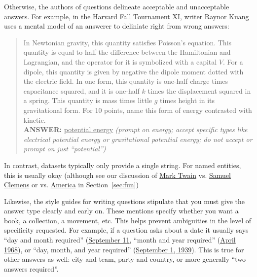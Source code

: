 Otherwise, the authors of questions delineate acceptable and unacceptable answers.  
For example, in the Harvard Fall Tournament XI, writer Raynor Kuang uses a mental model of an answerer to deliniate right from wrong answers:
\begin{quote}
     In Newtonian gravity, this quantity satisfies Poisson's equation. This quantity is equal to half the difference between the Hamiltonian and Lagrangian, and the operator for it is symbolized with a capital $V$. For a dipole, this quantity is given by negative the dipole moment dotted with the electric field. In one form, this quantity is one-half charge times capacitance squared, and it is one-half $k$ times the displacement squared in a spring. This quantity is mass times little $g$ times height in its gravitational form. For 10 points, name this form of energy contrasted with kinetic.\\
    {\bf ANSWER:} \underline{potential energy} \textit{(prompt on energy; accept specific types like electrical potential energy or gravitational potential energy; do not accept or prompt on just ``potential'')}
\end{quote}
In contrast, \qa{} datasets typically only provide a single string.  For named entities, this is usually okay (although see our discussion of \underline{Mark Twain} vs. \underline{Samuel Clemens} or \underline{} vs. \underline{America} in Section~\ref{sec:fun})

Likewise, the style guides for writing questions stipulate that you
must give the answer type clearly and early on.
These mentions specify whether you want a book, a collection, a movement, etc.  This helps
prevent ambiguities in the level of specificity requested.  
For example, if a question asks about a date it usually says ``day and month required'' (\underline{September 11}, ``month and year required'' (\underline{April 1968}), or ``day, month, and year required'' (\underline{September 1, 1939}).
This is true for other answers as well: city and team, party and country, or more generally ``two answers required''.

